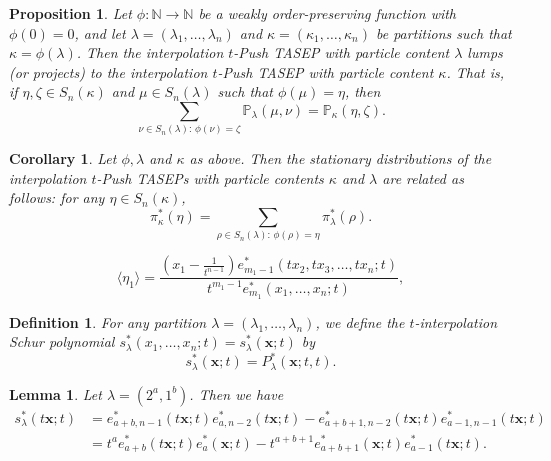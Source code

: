 \documentclass[10pt,a4paper]{amsart}
\newtheorem{prop}{Proposition}
\newtheorem{cor}{Corollary}
\newtheorem{definition}{Definition}
\newtheorem{lem}{Lemma}
\newcommand{\NN}{\mathbb N}
\newcommand{\PP}{\mathbb P}
\newcommand{\bfx}{\boldsymbol{x}}
\begin{document}
\begin{prop}\label{prop:lumping}
    Let $\phi:\NN \to \NN$ be a weakly order-preserving function with $\phi(0)=0$, and let $\lambda=(\lambda_1,\dots,\lambda_n)$ and $\kappa=(\kappa_1,\dots,\kappa_n)$ be  partitions such that $\kappa=\phi(\lambda)$.
Then the interpolation $t$-Push TASEP with particle content $\lambda$ lumps (or projects) to the interpolation $t$-Push TASEP with particle content $\kappa$.  That is,  
    if $\eta,\zeta\in S_n(\kappa)$ and $\mu\in S_n(\lambda)$ such that $\phi(\mu)=\eta$, then
    $$\sum_{\nu\in S_n(\lambda):\, \phi(\nu)=\zeta}\PP_{\lambda}(\mu,\nu)=\PP_\kappa(\eta,\zeta).$$
\end{prop}

\begin{cor}\label{cor:lumping}
Let $\phi,\lambda$ and $\kappa$ as above. Then  the stationary distributions of the 
interpolation $t$-Push TASEPs with particle contents $\kappa$ and $\lambda$ are related as follows:
for any $\eta\in S_n(\kappa)$, 
$$\pi^*_\kappa(\eta)=\sum_{\rho\in S_n(\lambda):\, \phi(\rho)=\eta}\pi^*_\lambda(\rho).$$
\end{cor}

  \begin{equation}\label{eq:density}
  \langle \eta_1 \rangle =
  \frac{(x_1-\frac{1}{t^{n-1}}) e^*_{m_1-1}(tx_2, tx_3,\dots,tx_n;t)} {t^{m_1-1} e^*_{m_1}(x_1,\dots,x_n;t)},
  \end{equation}

\begin{definition}\label{def:sstar}
For any partition $\lambda=(\lambda_1,\dots,\lambda_n)$, we define the \emph{$t$-interpolation Schur polynomial $s_\lambda^*(x_1,\dots,x_n;t)=s^*_\lambda(\bfx;t)$} by
    $$s^*_\lambda(\bfx;t)=P^*_\lambda(\bfx;t,t).$$
\end{definition}

\begin{lem}\label{lem:2column}
Let $\lambda=(2^a,1^b)$.  Then we have 
\begin{align*}
s^*_{\lambda}(t\bfx;t)&=e^*_{a+b,n-1}(t\bfx;t)e^*_{a,n-2}(t\bfx;t)-e^*_{a+b+1,n-2}(t\bfx;t)e^*_{a-1,n-1}(t\bfx;t)\\
&=t^a e^*_{a+b}(t\bfx;t) e^*_a(\bfx;t) - t^{a+b+1} e^*_{a+b+1}(\bfx;t) e^*_{a-1}(t\bfx;t).
\end{align*}
\end{lem}
\end{document}
